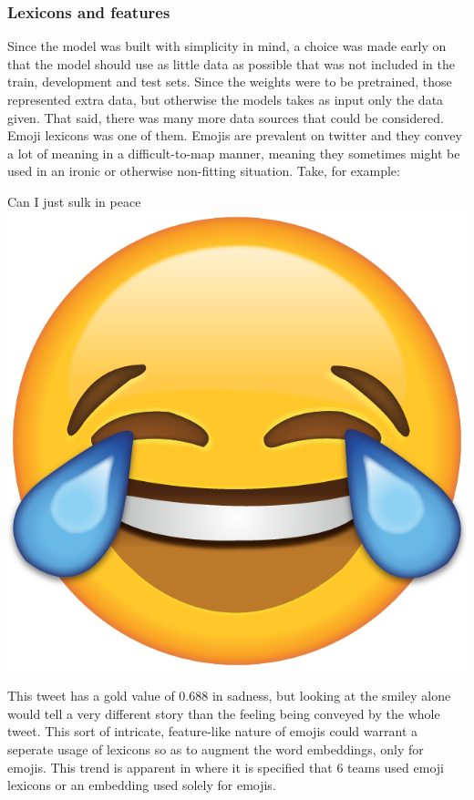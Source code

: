 \subsubsection{Lexicons and features}
Since the model was built with simplicity in mind, a choice was made early on that the model should use as little data as possible that was not included in the train, development and test sets. Since the weights were to be pretrained, those represented extra data, but otherwise the models takes as input only the data given. That said, there was many more data sources that could be considered.\\
Emoji lexicons was one of them. Emojis are prevalent on twitter and they convey a lot of meaning in a difficult-to-map manner, meaning they sometimes might be used in an ironic or otherwise non-fitting situation. Take, for example:\\
\begin{center}
Can I just sulk in peace \includegraphics[scale=0.015]{pictures/tears_of_joy_emoji.png}
\end{center}
This tweet has a gold value of 0.688 in sadness, but looking at the smiley alone would tell a very different story than the feeling being conveyed by the whole tweet. This sort of intricate, feature-like nature of emojis could warrant a seperate usage of lexicons so as to augment the word embeddings, only for emojis. This trend is apparent in \cite{wassa2017} where it is specified that 6 teams used emoji lexicons or an embedding used solely for emojis.\\
